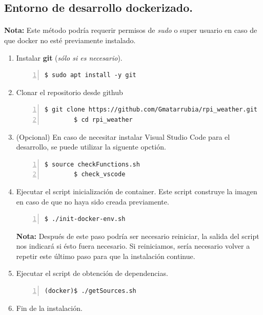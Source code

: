 \subsection{Entorno de desarrollo dockerizado.}

\paragraph{}\textbf{Nota:} Este método podría requerir permisos de \emph{sudo} o super
usuario en caso de que docker no esté previamente instalado.

\begin{enumerate}
    \item Instalar \textbf{\gls{git}} (\emph{sólo si es necesario}).
    \begin{lstlisting}[style=consola, numbers=left]
        $ sudo apt install -y git
    \end{lstlisting}

    \item Clonar el repositorio desde github
    \begin{lstlisting}[style=consola, numbers=left]
        $ git clone https://github.com/Gmatarrubia/rpi_weather.git
        $ cd rpi_weather
    \end{lstlisting}

    \item (Opcional) En caso de necesitar instalar Visual Studio Code para el desarrollo,
    se puede utilizar la siguente opctión.
    \begin{lstlisting}[style=consola, numbers=left]
        $ source checkFunctions.sh
        $ check_vscode
    \end{lstlisting}

    \item Ejecutar el script inicialización de container. Este script construye la
    imagen en caso de que no haya sido creada previamente.
    \begin{lstlisting}[style=consola, numbers=left]
        $ ./init-docker-env.sh
    \end{lstlisting}
    \textbf{Nota:} Después de este paso podría ser necesario reiniciar, la salida del
    script nos indicará si ésto fuera necesario. Si reiniciamos, sería necesario volver
    a repetir este último paso para que la instalación continue.

    \item Ejecutar el script de obtención de dependencias.
    \begin{lstlisting}[style=consola, numbers=left]
        (docker)$ ./getSources.sh
    \end{lstlisting}

    \item Fin de la instalación.
\end{enumerate}

